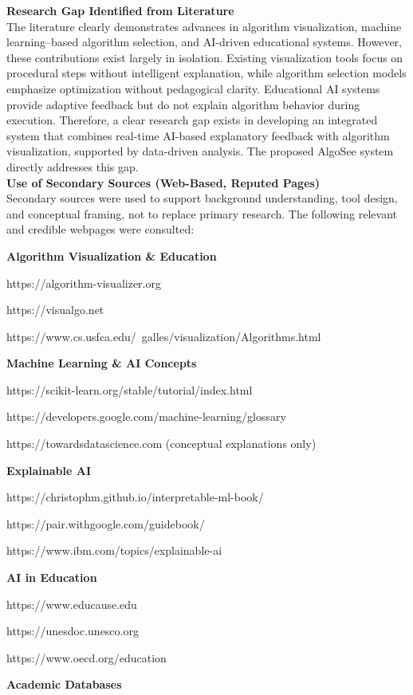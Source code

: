 \documentclass[12pt,a4paper,oneside,openany]{report}
\begin{document}
\textbf{Research Gap Identified from Literature}\\

The literature clearly demonstrates advances in algorithm visualization, machine learning–based algorithm selection, and AI-driven educational systems. However, these contributions exist largely in isolation. Existing visualization tools focus on procedural steps without intelligent explanation, while algorithm selection models emphasize optimization without pedagogical clarity. Educational AI systems provide adaptive feedback but do not explain algorithm behavior during execution. Therefore, a clear research gap exists in developing an integrated system that combines real-time AI-based explanatory feedback with algorithm visualization, supported by data-driven analysis. The proposed AlgoSee system directly addresses this gap.\\

\textbf{Use of Secondary Sources (Web-Based, Reputed Pages)}\\
Secondary sources were used to support background understanding, tool design, and conceptual framing, not to replace primary research. The following relevant and credible webpages were consulted:

\textbf{Algorithm Visualization \& Education}

https://algorithm-visualizer.org

https://visualgo.net

https://www.cs.usfca.edu/~galles/visualization/Algorithms.html

\textbf{Machine Learning \& AI Concepts}

https://scikit-learn.org/stable/tutorial/index.html

https://developers.google.com/machine-learning/glossary

https://towardsdatascience.com
 (conceptual explanations only)

\textbf{Explainable AI}

https://christophm.github.io/interpretable-ml-book/

https://pair.withgoogle.com/guidebook/

https://www.ibm.com/topics/explainable-ai

\textbf{AI in Education}

https://www.educause.edu

https://unesdoc.unesco.org

https://www.oecd.org/education

\textbf{Academic Databases}
\end{document}
